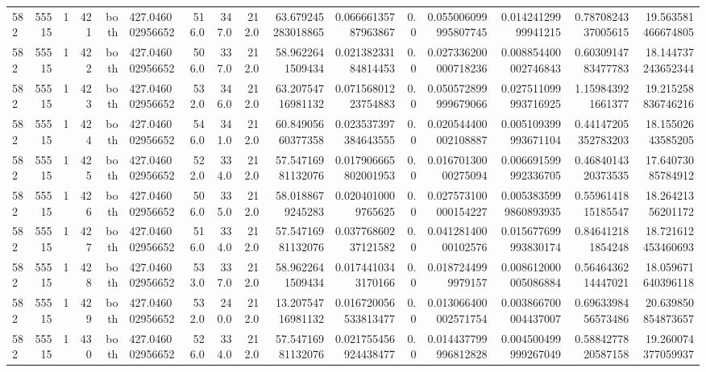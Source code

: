 \begin{tabular}{lrrrrlrrrrrrrrrr}
582 & 55515 & 1 & 421 & both & 427.046002956652 & 516.0 & 347.0 & 212.0 & 63.679245283018865 & 0.06666135787963867 & 0.0 & 0.055006099995807745 & 0.01424129999941215 & 0.7870824337005615 & 19.563581466674805 \\
582 & 55515 & 1 & 422 & both & 427.046002956652 & 506.0 & 337.0 & 212.0 & 58.9622641509434 & 0.02138233184814453 & 0.0 & 0.027336200000718236 & 0.008854400002746843 & 0.6030914783477783 & 18.144737243652344 \\
582 & 55515 & 1 & 423 & both & 427.046002956652 & 532.0 & 346.0 & 212.0 & 63.20754716981132 & 0.07156801223754883 & 0.0 & 0.050572899999679066 & 0.027511099993716925 & 1.159843921661377 & 19.215258836746216 \\
582 & 55515 & 1 & 424 & both & 427.046002956652 & 546.0 & 341.0 & 212.0 & 60.84905660377358 & 0.023537397384643555 & 0.0 & 0.020544400002108887 & 0.005109399993671104 & 0.44147205352783203 & 18.15502643585205 \\
582 & 55515 & 1 & 425 & both & 427.046002956652 & 522.0 & 334.0 & 212.0 & 57.54716981132076 & 0.017906665802001953 & 0.0 & 0.01670130000275094 & 0.006691599992336705 & 0.4684014320373535 & 17.64073085784912 \\
582 & 55515 & 1 & 426 & both & 427.046002956652 & 506.0 & 335.0 & 212.0 & 58.0188679245283 & 0.0204010009765625 & 0.0 & 0.027573100000154227 & 0.0053835999860893935 & 0.5596141815185547 & 18.26421356201172 \\
582 & 55515 & 1 & 427 & both & 427.046002956652 & 516.0 & 334.0 & 212.0 & 57.54716981132076 & 0.03776860237121582 & 0.0 & 0.04128140000102576 & 0.015677699993830174 & 0.846412181854248 & 18.721612453460693 \\
582 & 55515 & 1 & 428 & both & 427.046002956652 & 533.0 & 337.0 & 212.0 & 58.9622641509434 & 0.0174410343170166 & 0.0 & 0.0187244999979157 & 0.008612000005086884 & 0.5646436214447021 & 18.059671640396118 \\
582 & 55515 & 1 & 429 & both & 427.046002956652 & 532.0 & 240.0 & 212.0 & 13.20754716981132 & 0.016720056533813477 & 0.0 & 0.013066400002571754 & 0.003866700004437007 & 0.6963398456573486 & 20.639850854873657 \\
582 & 55515 & 1 & 430 & both & 427.046002956652 & 526.0 & 334.0 & 212.0 & 57.54716981132076 & 0.021755456924438477 & 0.0 & 0.014437799996812828 & 0.004500499999267049 & 0.5884277820587158 & 19.260074377059937 \\
\hline
\end{tabular}
